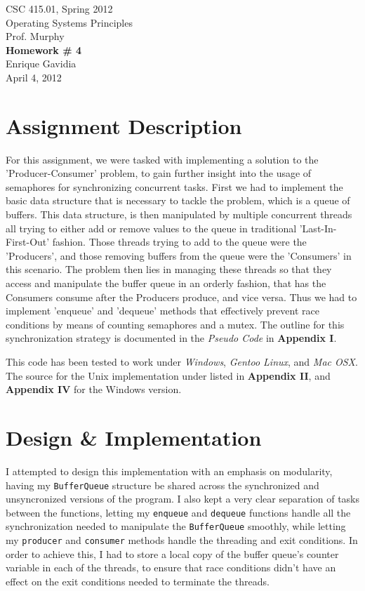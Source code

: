 \documentclass[12pt]{article}
\def \name       {Enrique Gavidia}
\def \coursenum  {CSC 415.01}
\def \coursename {Operating Systems Principles}
\def \instructor {Prof. Murphy}
\def \semester   {Spring 2012}
\def \assignment {Homework \# 4}
\def \duedate    {April 4, 2012}
\newcommand {\makecover} {
  \begin{titlepage}
    \begin{center}
      \LARGE{\coursenum, \semester \\ \coursename}\\
      \Large{\instructor}\\
      \vfill
      \textbf{\Huge \assignment}\\
      \vfill
      \Large{\name}\\
      \large{\duedate}
    \end{center}
  \end{titlepage}
}
\begin{document}
\makecover

\section*{Assignment Description}
For this assignment, we were tasked with implementing a solution to the 'Producer-Consumer' problem, to gain further insight into the
usage of semaphores for synchronizing concurrent tasks.  First we had to implement the basic data structure that is necessary to tackle
the problem, which is a queue of buffers. This data structure, is then  manipulated by multiple concurrent threads all trying to either add or remove
values to the queue in traditional 'Last-In-First-Out' fashion. Those threads trying to add to the queue were the 'Producers', and those removing
buffers from the queue were the 'Consumers' in this scenario.  The problem then lies in managing these threads so that they access and manipulate
the buffer queue in an orderly fashion, that has the Consumers consume after the Producers produce, and vice versa.  Thus we had to implement 'enqueue' 
and 'dequeue' methods that effectively prevent race conditions by means of counting semaphores and a mutex. The outline for this synchronization
strategy is documented in the \textsl{Pseudo Code} in \textbf{Appendix I}.

This code has been tested to work under \textsl{Windows}, \textsl{Gentoo Linux}, and \textsl{Mac OSX}.
The source for the Unix implementation under listed in \textbf{Appendix II}, and \textbf{Appendix IV} for the Windows version.


\section*{Design \& Implementation}
I attempted to design this implementation with an emphasis on modularity, having my \texttt{BufferQueue} structure be shared across the synchronized
and unsyncronized versions of the program. I also kept a very clear separation of tasks between the functions, letting my \texttt{enqueue} and \texttt{dequeue} 
functions handle all the synchronization needed to manipulate the \texttt{BufferQueue} smoothly, while letting my \texttt{producer} and \texttt{consumer}
methods handle the threading and exit conditions. In order to achieve this, I had to store a local copy of the buffer queue's counter variable in each of the
threads, to ensure that race conditions didn't have an effect on the exit conditions needed to terminate the threads.
\end{document}
